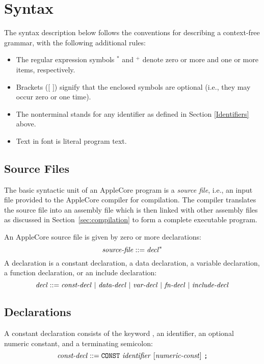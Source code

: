 \documentclass[10pt]{article}
\begin{document}
\section{Syntax}
\label{sec:syntax}

The syntax description below follows the conventions for describing a
context-free grammar, with the following additional rules:
\begin{itemize}
\item The regular expression symbols $^*$ and $^+$ denote zero or more
  and one or more items, respectively.
\item Brackets ($[$ $]$) signify that the enclosed symbols are
  optional (i.e., they may occur zero or one time).
\item The nonterminal  stands for any identifier as
defined in Section \ref{Identifiers} above.
\item Text in  font is literal program text.
\end{itemize}

\subsection{Source Files}
\label{sec:syntax:source-files}

The basic syntactic unit of an AppleCore program is a \emph{source
  file}, i.e., an input file provided to the AppleCore compiler for
compilation.  The compiler translates the source file into an assembly
file which is then linked with other assembly files as discussed in
Section~\ref{sec:compilation} to form a complete executable program.

An AppleCore source file is given by zero or more
declarations:
%
$$\mbox{\textit{source-file}} ::= \mbox{\textit{decl}}^*$$
%
A declaration is a constant declaration, a data declaration, a
variable declaration, a function declaration, or an include
declaration:
%
$$\mbox{\textit{decl}} ::= \mbox{\ensuremath{\mbox{\textit{const-decl}}} $|$
  \ensuremath{\mbox{\textit{data-decl}}} $|$ \ensuremath{\mbox{\textit{var-decl}}} $|$ \ensuremath{\mbox{\textit{fn-decl}}}
    $|$ \ensuremath{\mbox{\textit{include-decl}}}}$$

\subsection{Declarations}
\label{sec:syntax:declarations}

 A constant declaration consists of the
keyword , an identifier, an optional numeric constant, and
a terminating semicolon:
%
$$\mbox{\textit{const-decl}} ::= \mbox{\texttt{CONST} \ensuremath{\mbox{\textit{identifier}}}
  $[\mbox{\textit{numeric-const}}]$ \texttt{;}}$$
\end{document}
